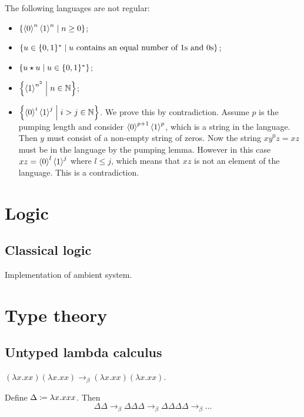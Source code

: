 \begin{example}
The following languages are not regular:
\begin{itemize}
\item $\left\{ \left\langle 0 \right\rangle^n\left\langle 1 \right\rangle^n \;\middle|\; n\geq 0 \right\}$;
\item $\left\{ u\in \{0, 1\}^* \;\middle|\; \text{$u$ contains an equal number of $1$s and $0$s} \right\}$;
\item $\left\{ u\star u \;\middle|\; u\in \{0,1\}^* \right\}$;
\item $\left\{ \left\langle 1 \right\rangle^{n^2} \;\middle|\; n\in \mathbb{N} \right\}$;
\item $\left\{ \left\langle 0 \right\rangle^i\left\langle 1 \right\rangle^j \;\middle|\; i>j \in \mathbb{N} \right\}$. We prove this by contradiction. Assume $p$ is the pumping length and consider $\left\langle 0 \right\rangle^{p+1}\left\langle 1 \right\rangle^p$, which is a string in the language. Then $y$ must consist of a non-empty string of zeros. Now the string $xy^0z = xz$ must be in the language by the pumping lemma. However in this case $xz = \left\langle 0 \right\rangle^l\left\langle 1 \right\rangle^j$ where $l\leq j$, which means that $xz$ is not an element of the language. This is a contradiction.
\end{itemize}
\end{example}

\chapter{Logic}
\section{Classical logic}
Implementation of ambient system.

\chapter{Type theory}
\section{Untyped lambda calculus}

\begin{example}
$(\lambda x. x x)(\lambda x. x x) \to_\beta (\lambda x. x x)(\lambda x. x x)$.

Define $\Delta \coloneqq \lambda x. xxx$. Then
\[ \Delta\Delta \to_\beta \Delta\Delta\Delta \to_\beta \Delta\Delta\Delta\Delta \to_\beta \ldots \]
\end{example}

